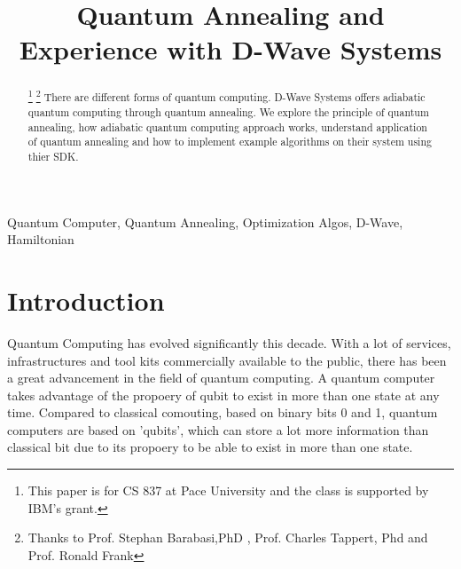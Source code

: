 \documentclass[12pt,conference]{IEEEtran}
\begin{document}
\title{Quantum Annealing and Experience with D-Wave Systems}


\author{
\and
{}
}


\maketitle

\begin{abstract}
\footnote  {This paper is for CS 837 at Pace University and the class is supported by IBM's grant.}
\footnote{ Thanks to Prof. Stephan Barabasi,PhD , Prof. Charles Tappert, Phd and Prof. Ronald Frank} There are different forms of quantum computing. D-Wave Systems offers adiabatic quantum computing through quantum annealing. We explore the principle of quantum annealing, how adiabatic quantum computing approach works, understand application of quantum annealing and how to implement example algorithms on their system using thier SDK.
\end{abstract}

\begin{IEEEkeywords}
Quantum Computer, Quantum Annealing, Optimization Algos, D-Wave, Hamiltonian
\end{IEEEkeywords}


\section{Introduction}
Quantum Computing has evolved significantly this decade. With a lot of services, infrastructures and tool kits commercially available to the public, there has been a great advancement in the field of quantum computing. A quantum computer takes advantage of the  propoery of qubit to exist in more than one state at any time. Compared to classical comouting, based on binary bits 0 and 1, quantum computers are based on 'qubits', which can store a lot more information than classical bit due to its propoery to be able to exist in more than one state. \cite{1}
\end{document}
